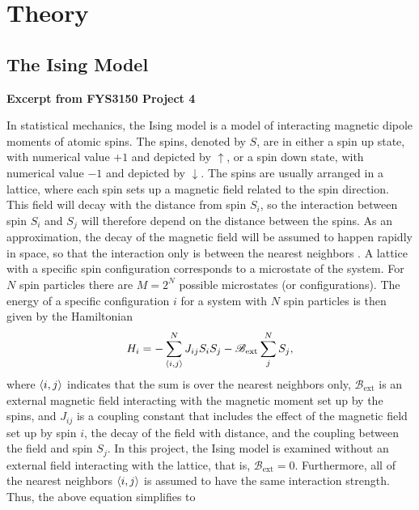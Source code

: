 \section{Theory}\label{sec:Theory}

\subsection{The Ising Model}\label{sec:ising theory}
\textbf{Excerpt from FYS3150 Project 4}

In statistical mechanics, the Ising model is a model of interacting magnetic dipole moments of atomic spins. The spins, denoted by $S$, are in either a spin up state, with numerical value $+1$ and depicted by $\uparrow$, or a spin down state, with numerical value $- 1$ and depicted by $\downarrow$. The spins are usually arranged in a lattice, where each spin sets up a magnetic field related to the spin direction. This field will decay with the distance from spin $S_i$, so the interaction between spin $S_i$ and $S_j$ will therefore depend on the distance between the spins. As an approximation, the decay of the magnetic field will be assumed to happen rapidly in space, so that the interaction only is between the nearest neighbors \cite[p. 211-212]{Malthe}. A lattice with a specific spin configuration corresponds to a microstate of the system. For $N$ spin particles there are $M=2^N$ possible microstates (or configurations). The energy of a specific configuration $i$ for a system with $N$ spin particles is then given by the Hamiltonian \cite[p. 421]{MHJ}
\begin{equation*}
    H_i = - \sum_{\ev{i,j}}^N J_{ij} S_i S_j - \mathcal{B}_\mathrm{ext} \sum_{j}^N S_j ,
\end{equation*}
where $\ev{i,j}$ indicates that the sum is over the nearest neighbors only, $\mathcal{B}_\mathrm{ext}$ is an external magnetic field interacting with the magnetic moment set up by the spins, and $J_{ij}$ is a coupling constant that includes the effect of the magnetic field set up by spin $i$, the decay of the field with distance, and the coupling between the field and spin $S_j$. In this project, the Ising model is examined without an external field interacting with the lattice, that is, $\mathcal{B}_\mathrm{ext}=0$. Furthermore, all of the nearest neighbors $\ev{i,j}$ is assumed to have the same interaction strength. Thus, the above equation simplifies to
